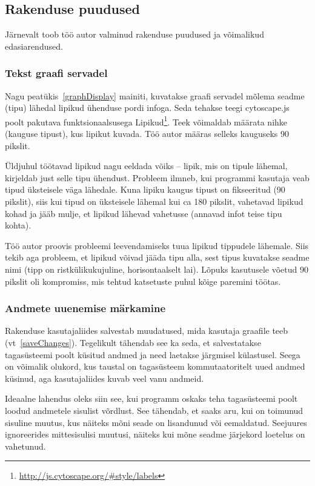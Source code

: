 \documentclass[12pt]{article}
\begin{document}
\subsection{Rakenduse puudused}
Järnevalt toob töö autor valminud rakenduse puudused ja võimalikud edasiarendused.

\subsubsection{Tekst graafi servadel}
Nagu peatükis~\ref{graphDisplay} mainiti, kuvatakse graafi servadel mõlema seadme (tipu) lähedal
lipikud ühenduse pordi infoga.
Seda tehakse teegi cytoscape.js poolt pakutava
funktsionaalsusega Lipikud\footnote{\url{http://js.cytoscape.org/\#style/labels}}.
Teek võimaldab määrata nihke (kauguse tipust), kus lipikut kuvada.
Töö autor määras selleks kauguseks 90 pikslit.

Üldjuhul töötavad lipikud nagu eeldada võiks -- lipik, mis on tipule lähemal, kirjeldab just selle
tipu ühendust.
Probleem ilmneb, kui programmi kasutaja veab tipud üksteisele väga lähedale.
Kuna lipiku kaugus tipust on fikseeritud (90 pikslit), siis kui tipud on üksteisele lähemal kui ca
180 pikslit,
vahetavad lipikud kohad ja jääb mulje, et lipikud lähevad vahetusse (annavad infot teise tipu
kohta).

Töö autor proovis probleemi leevendamiseks tuua lipikud tippudele lähemale.
Siis tekib aga probleem, et lipikud võivad jääda tipu alla, sest tipus kuvatakse seadme nimi (tipp
on ristkülikukujuline, horisontaalselt lai).
Lõpuks kasutusele võetud 90 pikslit oli kompromiss, mis tehtud katsetuste puhul kõige paremini töötas.

\subsubsection{Andmete uuenemise märkamine}
Rakenduse kasutajaliides salvestab muudatused, mida kasutaja graafile teeb (vt~\ref{saveChanges}).
Tegelikult tähendab see ka seda, et salvestatakse tagasüsteemi poolt küsitud andmed ja need
laetakse järgmisel külastusel.
Seega on võimalik olukord, kus taustal on tagasüsteem kommutaatoritelt uued andmed küsinud, aga
kasutajaliides kuvab veel vanu andmeid.

Ideaalne lahendus oleks siin see, kui programm oskaks teha tagasüsteemi poolt loodud andmetele
sisulist võrdlust.
See tähendab, et saaks aru, kui on toimunud sisuline muutus, kus näiteks mõni seade on lisandunud
või eemaldatud.
Seejuures ignoreerides mittesisulisi muutusi, näiteks kui mõne seadme järjekord loetelus on
vahetunud.
\end{document}
